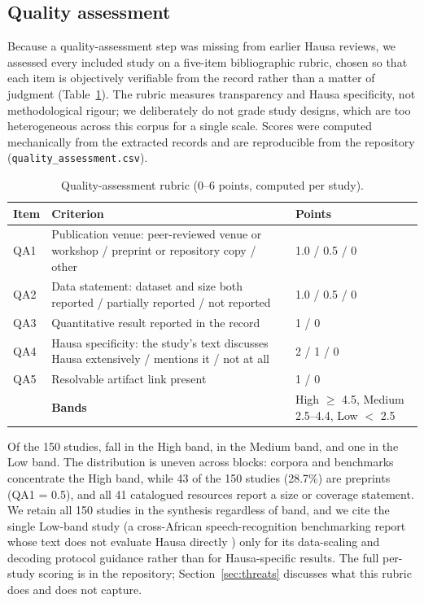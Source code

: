\documentclass[sn-basic,pdflatex]{sn-jnl}
\begin{document}
\subsection{Quality assessment}\label{sec:qa}
Because a quality-assessment step was missing from earlier Hausa reviews, we assessed every included study on a five-item bibliographic rubric, chosen so that each item is objectively verifiable from the record rather than a matter of judgment (Table~\ref{tab:qa}). The rubric measures transparency and Hausa specificity, not methodological rigour; we deliberately do not grade study designs, which are too heterogeneous across this corpus for a single scale. Scores were computed mechanically from the extracted records and are reproducible from the repository (\texttt{quality\_assessment.csv}).

\begin{table}[t]\centering\small
\caption{Quality-assessment rubric (0--6 points, computed per study).}
\label{tab:qa}
\begin{tabular}{@{}p{} p{} p{}@{}}
\toprule
\textbf{Item} & \textbf{Criterion} & \textbf{Points} \\
\midrule
QA1 & Publication venue: peer-reviewed venue or workshop / preprint or repository copy / other & 1.0 / 0.5 / 0 \\
QA2 & Data statement: dataset and size both reported / partially reported / not reported & 1.0 / 0.5 / 0 \\
QA3 & Quantitative result reported in the record & 1 / 0 \\
QA4 & Hausa specificity: the study's text discusses Hausa extensively / mentions it / not at all & 2 / 1 / 0 \\
QA5 & Resolvable artifact link present & 1 / 0 \\
\midrule
 & \textbf{Bands} & High $\geq$ 4.5, Medium 2.5--4.4, Low $<$ 2.5 \\
\bottomrule
\end{tabular}
\end{table}

Of the 150 studies, \QAhigh{} fall in the High band, \QAmed{} in the Medium band, and one in the Low band. The distribution is uneven across blocks: corpora and benchmarks concentrate the High band, while 43 of the 150 studies (28.7\%) are preprints (QA1 = 0.5), and all 41 catalogued resources report a size or coverage statement. We retain all 150 studies in the synthesis regardless of band, and we cite the single Low-band study (a cross-African speech-recognition benchmarking report whose text does not evaluate Hausa directly \citep{p044}) only for its data-scaling and decoding protocol guidance rather than for Hausa-specific results. The full per-study scoring is in the repository; Section~\ref{sec:threats} discusses what this rubric does and does not capture.
\end{document}
